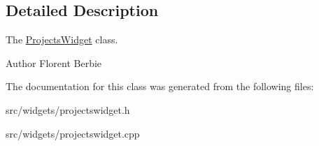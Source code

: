 \subsection{Detailed Description}
The \hyperlink{classProjectsWidget}{Projects\+Widget} class. 

\begin{DoxyAuthor}{Author}
Florent Berbie 
\end{DoxyAuthor}


The documentation for this class was generated from the following files\+:\begin{DoxyCompactItemize}
\item 
src/widgets/projectswidget.\+h\item 
src/widgets/projectswidget.\+cpp\end{DoxyCompactItemize}
